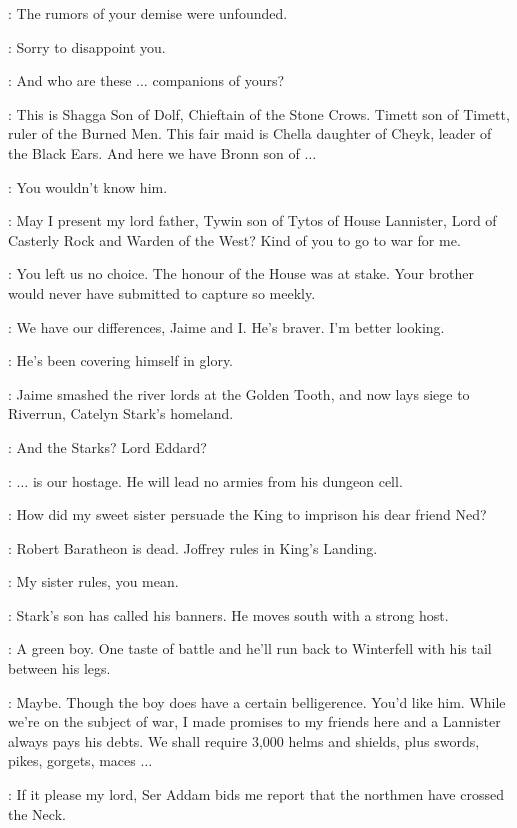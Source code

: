 \TYWIN: The rumors of your demise were unfounded. 

\TYRION: Sorry to disappoint you. 

\TYWIN: And who are these $\ldots$ companions of yours? 

\TYRION: This is Shagga Son of Dolf, Chieftain of the Stone Crows. Timett son of Timett, ruler of the Burned Men. This fair maid is Chella daughter of Cheyk, leader of the Black Ears. And here we have Bronn son of $\ldots$ 

\BRONN: You wouldn't know him. 

\TYRION: May I present my lord father, Tywin son of Tytos of House Lannister, Lord of Casterly Rock and Warden of the West? Kind of you to go to war for me. 

\TYWIN: You left us no choice. The honour of the House was at stake. Your brother would never have submitted to capture so meekly. 

\TYRION: We have our differences, Jaime and I. He's braver. I'm better looking. 

\TYWIN: He's been covering himself in glory. 

\KEVAN: Jaime smashed the river lords at the Golden Tooth, and now lays siege to Riverrun, Catelyn Stark's homeland. 

\TYRION: And the Starks? Lord Eddard? 

\TYWIN: $\ldots$ is our hostage. He will lead no armies from his dungeon cell. 

\TYRION: How did my sweet sister persuade the King to imprison his dear friend Ned? 

\TYWIN: Robert Baratheon is dead. Joffrey rules in King's Landing. 

\TYRION: My sister rules, you mean. 

\KEVAN: Stark's son has called his banners. He moves south with a strong host. 

\TYWIN: A green boy. One taste of battle and he'll run back to Winterfell with his tail between his legs. 

\TYRION: Maybe. Though the boy does have a certain belligerence. You'd like him. While we're on the subject of war, I made promises to my friends here and a Lannister always pays his debts. We shall require 3,000 helms and shields, plus swords, pikes, gorgets, maces $\ldots$  


\PAGE: If it please my lord, Ser Addam bids me report that the northmen have crossed the Neck. 

